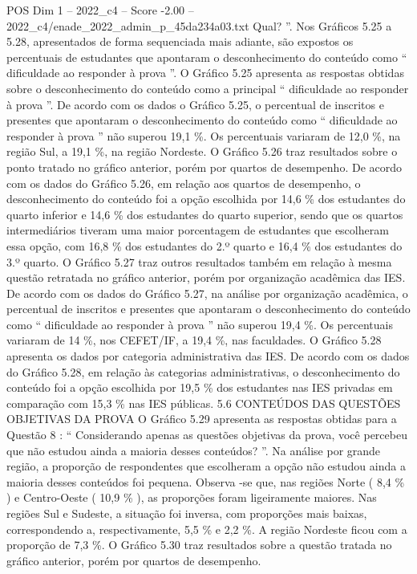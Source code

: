 \begin{textsample}{POS Dim 1 – 2022\_c4 – Score -2.00 – 2022\_c4/enade\_2022\_admin\_p\_45da234a03.txt}
Qual? ”.
Nos Gráficos 5.25 a 5.28, apresentados de forma sequenciada mais adiante, são expostos os percentuais de estudantes que apontaram o desconhecimento do conteúdo como “ dificuldade ao responder à prova ”.
O Gráfico 5.25 apresenta as respostas obtidas sobre o desconhecimento do conteúdo como a principal “ dificuldade ao responder à prova ”.
De acordo com os dados o Gráfico 5.25, o percentual de inscritos e presentes que apontaram o desconhecimento do conteúdo como “ dificuldade ao responder à prova ” não superou 19,1 \%.
Os percentuais variaram de 12,0 \%, na região Sul, a 19,1 \%, na região Nordeste.
O Gráfico 5.26 traz resultados sobre o ponto tratado no gráfico anterior, porém por quartos de desempenho.
De acordo com os dados do Gráfico 5.26, em relação aos quartos de desempenho, o desconhecimento do conteúdo foi a opção escolhida por 14,6 \% dos estudantes do quarto inferior e 14,6 \% dos estudantes do quarto superior, sendo que os quartos intermediários tiveram uma maior porcentagem de estudantes que escolheram essa opção, com 16,8 \% dos estudantes do 2.º quarto e 16,4 \% dos estudantes do 3.º quarto.
O Gráfico 5.27 traz outros resultados também em relação à mesma questão retratada no gráfico anterior, porém por organização acadêmica das IES.
De acordo com os dados do Gráfico 5.27, na análise por organização acadêmica, o percentual de inscritos e presentes que apontaram o desconhecimento do conteúdo como “ dificuldade ao responder à prova ” não superou 19,4 \%.
Os percentuais variaram de 14 \%, nos CEFET/IF, a 19,4 \%, nas faculdades.
O Gráfico 5.28 apresenta os dados por categoria administrativa das IES.
De acordo com os dados do Gráfico 5.28, em relação às categorias administrativas, o desconhecimento do conteúdo foi a opção escolhida por 19,5 \% dos estudantes nas IES privadas em comparação com 15,3 \% nas IES públicas. 5.6 CONTEÚDOS DAS QUESTÕES OBJETIVAS DA PROVA O Gráfico 5.29 apresenta as respostas obtidas para a Questão 8 : “ Considerando apenas as questões objetivas da prova, você percebeu que não estudou ainda a maioria desses conteúdos? ”.
Na análise por grande região, a proporção de respondentes que escolheram a opção não estudou ainda a maioria desses conteúdos foi pequena.
Observa -se que, nas regiões Norte ( 8,4 \% ) e Centro-Oeste ( 10,9 \% ), as proporções foram ligeiramente maiores.
Nas regiões Sul e Sudeste, a situação foi inversa, com proporções mais baixas, correspondendo a, respectivamente, 5,5 \% e 2,2 \%.
A região Nordeste ficou com a proporção de 7,3 \%.
O Gráfico 5.30 traz resultados sobre a questão tratada no gráfico anterior, porém por quartos de desempenho.

\end{textsample}
